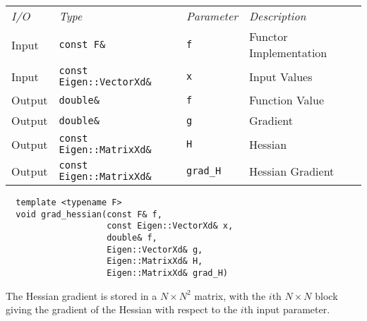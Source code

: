 \begin{tcolorbox}[colback=white,colframe=gray90, coltitle=black,boxrule=3pt,
fonttitle=\bfseries,title=Hessian Gradient]

\begin{tabular}{llll}
\textit{I/O} & \textit{Type} & \textit{Parameter} & \textit{Description} \\
Input & \texttt{const F\&} & \texttt{f} & Functor Implementation \\
Input & \texttt{const Eigen::VectorXd\&} & \texttt{x} & Input Values \\
Output & \texttt{double\&} & \texttt{f} & Function Value \\
Output & \texttt{double\&} & \texttt{g} & Gradient \\
Output & \texttt{const Eigen::MatrixXd\&} & \texttt{H} & Hessian \\
Output & \texttt{const Eigen::MatrixXd\&} & \texttt{grad\_H} & Hessian Gradient \\
\end{tabular}

\vspace{5mm}

\begin{verbatim}
  template <typename F>
  void grad_hessian(const F& f,
                    const Eigen::VectorXd& x,
                    double& f,
                    Eigen::VectorXd& g,
                    Eigen::MatrixXd& H,
                    Eigen::MatrixXd& grad_H)
\end{verbatim}

\vspace{5mm}

The Hessian gradient is stored in a $N \times N^{2}$ matrix, with the $i$th
$N \times N$ block giving the gradient of the Hessian with respect to the
$i$th input parameter.

\end{tcolorbox}

